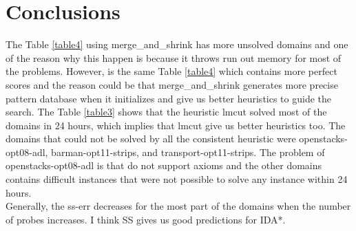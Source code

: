\documentclass[a4paper,12pt]{article}
\begin{document}
\section{Conclusions}
The Table \ref{table4} using {merge\_and\_shrink} has more unsolved domains and one of the reason why this happen is because it throws run out memory for most of the problems. However, is the same Table \ref{table4} which contains more perfect scores and the reason could be that {merge\_and\_shrink} generates more precise pattern database when it initializes and give us better heuristics to guide the search. The Table \ref{table3} shows that the heuristic lmcut solved most of the domains in  24 hours, which implies that lmcut give us better heuristics too. The domains that could not be solved by all the consistent heuristic were openstacks-opt08-adl, barman-opt11-strips, and transport-opt11-strips. The problem of openstacks-opt08-adl is that do not support axioms and the other domains contains difficult instances that were not possible to solve any instance within 24 hours.\\

Generally, the ss-err decreases for the most part of the domains when the number of probes increases. I think SS gives us good predictions for IDA*.
\end{document}
